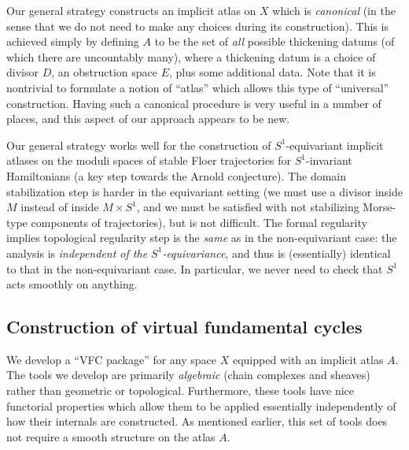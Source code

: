 \documentclass[12pt]{article}
\theoremstyle{definition}
\theoremstyle{remark}
\numberwithin{equation}{subsection}
\begin{document}
Our general strategy constructs an implicit atlas on $X$ which is \emph{canonical} (in the sense that we do not need to make any choices during its construction).  This is achieved simply by defining $A$ to be the set of \emph{all} possible thickening datums (of which there are uncountably many), where a thickening datum is a choice of divisor $D$, an obstruction space $E$, plus some additional data.  Note that it is nontrivial to formulate a notion of ``atlas'' which allows this type of ``universal'' construction.  Having such a canonical procedure is very useful in a number of places, and this aspect of our approach appears to be new.

Our general strategy works well for the construction of $S^1$-equivariant implicit atlases on the moduli spaces of stable Floer trajectories for $S^1$-invariant Hamiltonians (a key step towards the Arnold conjecture).  The domain stabilization step is harder in the equivariant setting (we must use a divisor inside $M$ instead of inside $M\times S^1$, and we must be satisfied with not stabilizing Morse-type components of trajectories), but is not difficult.  The formal regularity implies topological regularity step is the \emph{same} as in the non-equivariant case: the analysis is \emph{independent of the $S^1$-equivariance}, and thus is (essentially) identical to that in the non-equivariant case.  In particular, we never need to check that $S^1$ acts smoothly on anything.

\subsection{Construction of virtual fundamental cycles}

We develop a ``VFC package'' for any space $X$ equipped with an implicit atlas $A$.  The tools we develop are primarily \emph{algebraic} (chain complexes and sheaves) rather than geometric or topological.  Furthermore, these tools have nice functorial properties which allow them to be applied essentially independently of how their internals are constructed.  As mentioned earlier, this set of tools does not require a smooth structure on the atlas $A$.
\end{document}
